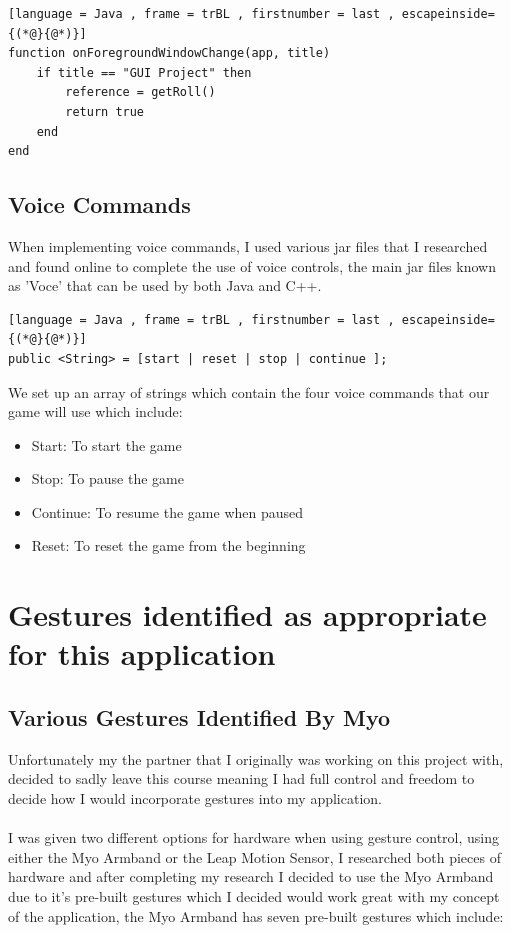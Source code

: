 \documentclass{article}
\begin{document}
\begin{lstlisting}[language = Java , frame = trBL , firstnumber = last , escapeinside={(*@}{@*)}]
function onForegroundWindowChange(app, title)
    if title == "GUI Project" then
        reference = getRoll()
        return true
    end 
end
\end{lstlisting}

\subsection{Voice Commands}

When implementing voice commands, I used various jar files that I researched and found online to complete the use of voice controls, the main jar files known as 'Voce' that can be used by both Java and C++.

\begin{lstlisting}[language = Java , frame = trBL , firstnumber = last , escapeinside={(*@}{@*)}]
public <String> = [start | reset | stop | continue ];
\end{lstlisting}
We set up an array of strings which contain the four voice commands that our game will use which include:

\begin{itemize}
    \item Start: To start the game
    \item Stop: To pause the game
    \item Continue: To resume the game when paused
    \item Reset: To reset the game from the beginning
\end{itemize}

\section{Gestures identified as appropriate for this application}

\subsection{Various Gestures Identified By Myo}

Unfortunately my the partner that I originally was working on this project with, decided to sadly leave this course meaning I had full control and freedom to decide how I would incorporate gestures into my application.\\ \\
I was given two different options for hardware when using gesture control, using either the Myo Armband or the Leap Motion Sensor, I researched both pieces of hardware and after completing my research I decided to use the Myo Armband due to it's pre-built gestures which I decided would work great with my concept of the application, the Myo Armband has seven pre-built gestures which include:
\end{document}
